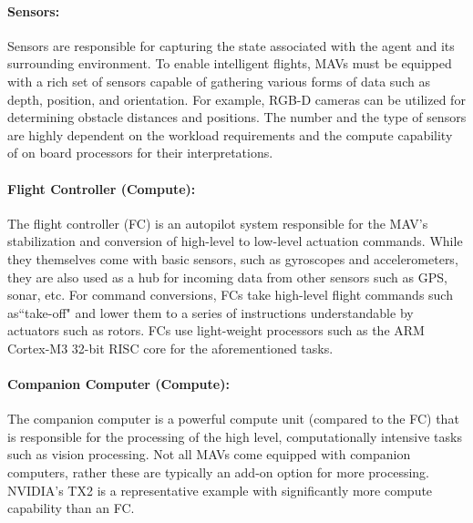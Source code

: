 \paragraph{Sensors:} Sensors are responsible for capturing the state associated with the agent and its surrounding environment. 
To enable intelligent flights, MAVs must be equipped with a rich set of sensors capable of gathering various forms of data such as depth, position, and orientation. For example, \mbox{RGB-D} cameras can be utilized for determining obstacle distances and positions. The number and the type of sensors are highly dependent on the workload requirements and the compute capability of on board processors for their interpretations.


\paragraph{Flight Controller (Compute):} The flight controller (FC) is an autopilot system responsible for the MAV's stabilization and conversion of high-level to low-level actuation commands. 
While they themselves come with basic sensors, such as gyroscopes and accelerometers, they are also used as a hub for incoming data from other sensors such as GPS, sonar, etc. For command conversions, FCs take high-level flight commands such as``take-off" and lower them to a series of instructions understandable by actuators such as rotors. FCs use light-weight processors such as the ARM Cortex-M3 32-bit RISC core for the aforementioned tasks.    
 
\paragraph{Companion Computer (Compute):} The companion computer is a powerful compute unit (compared to the FC) that is responsible for the processing of the high level, computationally intensive tasks such as vision processing. Not all MAVs come equipped with companion computers, rather these are typically an add-on option for more processing. NVIDIA's TX2 is a representative example with significantly more compute capability than an FC.

